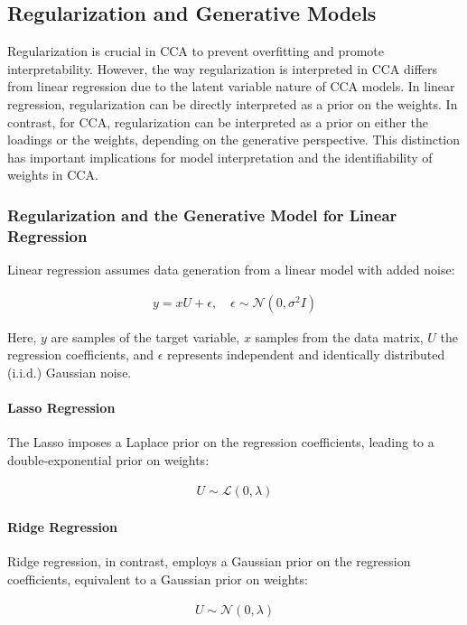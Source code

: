 \subsection{Regularization and Generative Models}

Regularization is crucial in CCA to prevent overfitting and promote interpretability. However, the way regularization is interpreted in CCA differs from linear regression due to the latent variable nature of CCA models. In linear regression, regularization can be directly interpreted as a prior on the weights. In contrast, for CCA, regularization can be interpreted as a prior on either the loadings or the weights, depending on the generative perspective. This distinction has important implications for model interpretation and the identifiability of weights in CCA.

\subsubsection{Regularization and the Generative Model for Linear Regression}
Linear regression assumes data generation from a linear model with added noise:

\begin{align}
    y = xU + \epsilon, \quad \epsilon \sim \mathcal{N}(0, \sigma^2 I)
\end{align}

Here, $y$ are samples of the target variable, $x$ samples from the data matrix, $U$ the regression coefficients, and $\epsilon$ represents independent and identically distributed (i.i.d.) Gaussian noise.

\paragraph{Lasso Regression}
The Lasso imposes a Laplace prior on the regression coefficients, leading to a double-exponential prior on weights:

\begin{align}
    U \sim \mathcal{L}(0, \lambda)
\end{align}

\paragraph{Ridge Regression}
Ridge regression, in contrast, employs a Gaussian prior on the regression coefficients, equivalent to a Gaussian prior on weights:

\begin{align}
    U \sim \mathcal{N}(0, \lambda)
\end{align}

